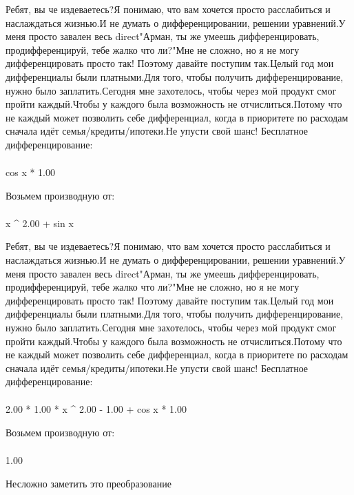 Ребят, вы че издеваетесь?Я понимаю, что вам хочется просто расслабиться и наслаждаться жизнью.И не думать о дифференцировании, решении уравнений.У меня просто завален весь direct"Арман, ты же умеешь дифференцировать, продифференцируй, тебе жалко что ли?"Мне не сложно, но я не могу дифференцировать просто так! Поэтому давайте поступим так.Целый год мои дифференциалы были платными.Для того, чтобы получить дифференцирование, нужно было заплатить.Сегодня мне захотелось, чтобы через мой продукт смог пройти каждый.Чтобы у каждого была возможность не отчислиться.Потому что не каждый может позволить себе дифференциал, когда в приоритете по расходам сначала идёт семья/кредиты/ипотеки.Не упусти свой шанс! Бесплатное дифференцирование: 
\begin{gather}
\end{gather}
\begin{}
cos x * 1.00 \\
\end{}
Возьмем производную от:
\begin{gather}
\end{gather}
\begin{}
x ^ {2.00 }+ sin x \\
\end{}
Ребят, вы че издеваетесь?Я понимаю, что вам хочется просто расслабиться и наслаждаться жизнью.И не думать о дифференцировании, решении уравнений.У меня просто завален весь direct"Арман, ты же умеешь дифференцировать, продифференцируй, тебе жалко что ли?"Мне не сложно, но я не могу дифференцировать просто так! Поэтому давайте поступим так.Целый год мои дифференциалы были платными.Для того, чтобы получить дифференцирование, нужно было заплатить.Сегодня мне захотелось, чтобы через мой продукт смог пройти каждый.Чтобы у каждого была возможность не отчислиться.Потому что не каждый может позволить себе дифференциал, когда в приоритете по расходам сначала идёт семья/кредиты/ипотеки.Не упусти свой шанс! Бесплатное дифференцирование: 
\begin{gather}
\end{gather}
\begin{}
2.00 * 1.00 * x ^ {2.00 - 1.00 }+ cos x * 1.00 \\
\end{}
Возьмем производную от:
\begin{gather}
\end{gather}
\begin{}
1.00 \\
\end{}
Несложно заметить это преобразование
